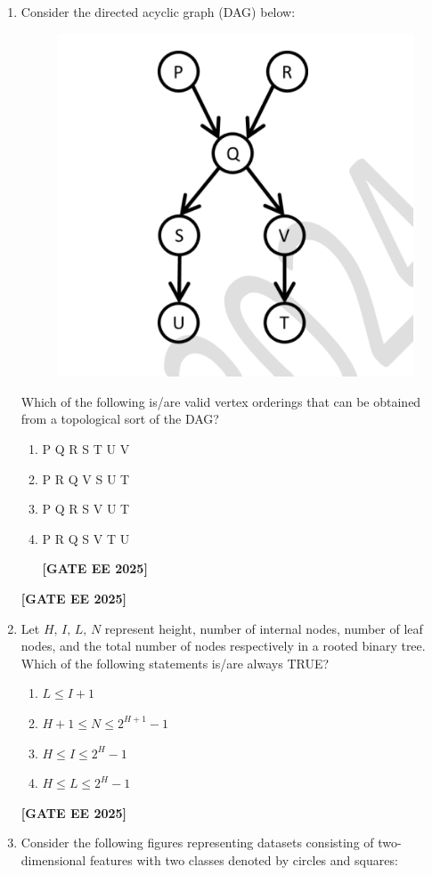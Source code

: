 \documentclass[journal]{IEEEtran}
\newcommand{\qfooter}{%
  \begin{flushright}\footnotesize\textbf{[GATE EE 2025]}\end{flushright}\vspace{1em}%
}
\begin{document}
\begin{enumerate}
\item Consider the directed acyclic graph (DAG) below:

\begin{figure}[h]
\centering
\includegraphics[width=0.55\columnwidth]{figs/51.png}
\label{fig:51}
\end{figure}

Which of the following is/are valid vertex orderings that can be obtained from a topological sort of the DAG?
\begin{enumerate}
\item P Q R S T U V
\item P R Q V S U T
\item P Q R S V U T
\item P R Q S V T U
\qfooter
\end{enumerate} \qfooter
\item Let $H,\,I,\,L,\,N$ represent height, number of internal nodes, number of leaf nodes, and the total number of nodes respectively in a rooted binary tree. Which of the following statements is/are always TRUE?
\begin{multicols}{2}
\begin{enumerate}
\item $L\leq I+1$
\item $H+1 \leq N \leq 2^{H+1}-1$
\item $H\leq I\leq 2^{H}-1$
\item $H\leq L\leq 2^{H}-1$
\end{enumerate} \qfooter
\end{multicols}

\item Consider the following figures representing datasets consisting of two-dimensional features with two classes denoted by circles and squares:


\end{enumerate}
\end{document}
